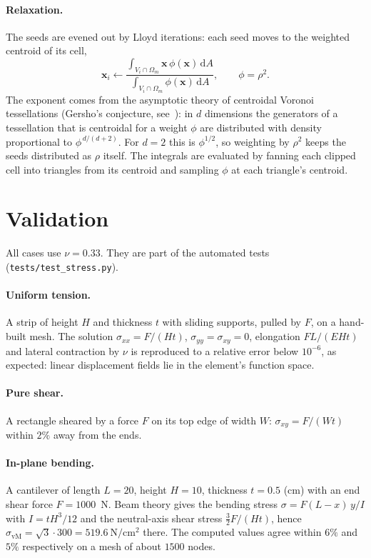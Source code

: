 \documentclass[11pt,a4paper]{article}
\newcommand{\vect}[1]{\mathbf{#1}}
\newcommand{\vm}{\sigma_{\mathrm{vM}}}
\begin{document}
\paragraph{Relaxation.} The seeds are evened out by Lloyd iterations: each
seed moves to the weighted centroid of its cell,
\begin{equation}
  \vect{x}_i \leftarrow
  \frac{\int_{V_i\cap\Omega_m} \vect{x}\,\phi(\vect{x})\,\mathrm{d}A}
       {\int_{V_i\cap\Omega_m} \phi(\vect{x})\,\mathrm{d}A},
  \qquad \phi = \rho^2 .
\end{equation}
The exponent comes from the asymptotic theory of centroidal Voronoi
tessellations (Gersho's conjecture, see~\cite{du}): in $d$ dimensions the generators of a
tessellation that is centroidal for a weight $\phi$ are distributed with
density proportional to $\phi^{\,d/(d+2)}$. For $d=2$ this is $\phi^{1/2}$, so
weighting by $\rho^2$ keeps the seeds distributed as $\rho$ itself. The
integrals are evaluated by fanning each clipped cell into triangles from its
centroid and sampling $\phi$ at each triangle's centroid.

\section{Validation}

All cases use $\nu = 0.33$. They are part of the automated tests
(\texttt{tests/test\_stress.py}).

\paragraph{Uniform tension.} A strip of height $H$ and thickness $t$ with
sliding supports, pulled by $F$, on a hand-built mesh. The solution
$\sigma_{xx}=F/(Ht)$, $\sigma_{yy}=\sigma_{xy}=0$, elongation $FL/(EHt)$ and
lateral contraction by $\nu$ is reproduced to a relative error below
$10^{-6}$, as expected: linear displacement fields lie in the element's
function space.

\paragraph{Pure shear.} A rectangle sheared by a force $F$ on its top edge of
width $W$: $\sigma_{xy}=F/(Wt)$ within $2\%$ away from the ends.

\paragraph{In-plane bending.} A cantilever of length $L=20$, height
$H=10$, thickness $t=0.5$ (cm) with an end shear force $F=1000$~N. Beam
theory gives the bending stress $\sigma = F(L-x)\,y/I$ with $I=tH^3/12$ and
the neutral-axis shear stress $\tfrac32 F/(Ht)$, hence $\vm=\sqrt3\cdot300 =
519.6~\mathrm{N/cm^2}$ there. The computed values agree within $6\%$ and
$5\%$ respectively on a mesh of about $1500$ nodes.
\end{document}
